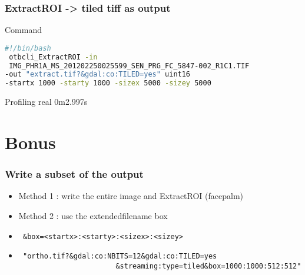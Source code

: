\documentclass[8pt]{beamer}
\begin{document}
\begin{frame}[fragile]
\frametitle{ExtractROI -> tiled tiff as output}

\begin{block}{Command}
\begin{lstlisting}[language=bash]
#!/bin/bash
 otbcli_ExtractROI -in
 IMG_PHR1A_MS_201202250025599_SEN_PRG_FC_5847-002_R1C1.TIF 
-out "extract.tif?&gdal:co:TILED=yes" uint16 
-startx 1000 -starty 1000 -sizex 5000 -sizey 5000
\end{lstlisting}
\end{block}

\begin{block}{Profiling}
real	0m2.997s
\end{block}

\end{frame}

\section{Bonus}
\begin{frame}[fragile]
\frametitle{Write a subset of the output}
\begin{itemize}
\item Method 1 : write the entire image and ExtractROI (facepalm)
\item Method 2 : use the extendedfilename box
\item \begin{verbatim} &box=<startx>:<starty>:<sizex>:<sizey> \end{verbatim}
\item \begin{verbatim} "ortho.tif?&gdal:co:NBITS=12&gdal:co:TILED=yes
                       &streaming:type=tiled&box=1000:1000:512:512" \end{verbatim}
\end{itemize}
\end{frame}
\end{document}
